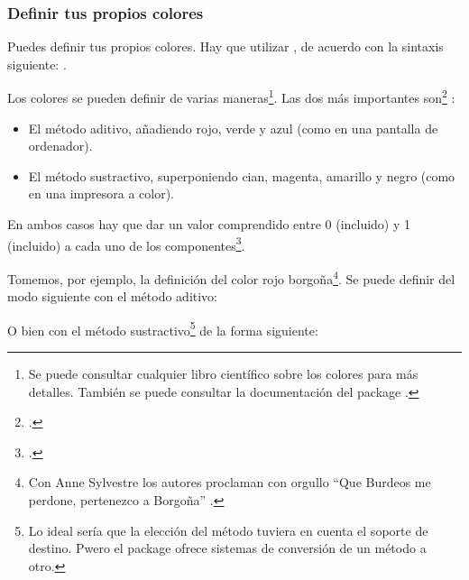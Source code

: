\subsubsection{Definir tus propios colores}

Puedes definir tus propios colores. Hay que utilizar  , de acuerdo con la sintaxis siguiente: 
.

Los colores se pueden definir de varias maneras\footnote{Se puede consultar cualquier libro científico sobre los colores para más detalles. También se puede consultar la documentación del package .}. Las dos más importantes son\footcite[Existe también el método de definición por la longitud de onda para los colores del arco iris, por porcentaje de gris para los distintos niveles de gris, así como por tinta, saturación y luminosidad, pero esto exigiría un curso de física de la luz. Para las personas interesadas en los detalles, consúltese][]{xcolor_methode} :
\begin{itemize}
\item El método aditivo, añadiendo rojo, verde y azul (como en una pantalla de ordenador).
\item El método sustractivo, superponiendo cian, magenta, amarillo y negro (como en una impresora a color).
\end{itemize}

En ambos casos hay que dar un valor comprendido entre 0 (incluido) y 1 (incluido) a cada uno de los componentes\footcite[Se puede encontrar una serie de código de colores en la página][]{codecouleur}.


Tomemos, por ejemplo, la definición del color \textcolor{rojoborgoña}{rojo borgoña}\footnote{Con Anne Sylvestre los autores proclaman con orgullo \enquote{Que Burdeos me perdone, pertenezco a Borgoña} \parencite{romaneconti}.}.
Se puede definir del modo siguiente con el método aditivo:

\begin{latexcode}
\end{latexcode}

O bien con el método sustractivo\footnote{Lo ideal sería que la elección del método tuviera en cuenta el soporte de destino. Pwero el package  ofrece sistemas de conversión de un método a otro.} de la forma siguiente:

\begin{latexcode}
\end{latexcode}


